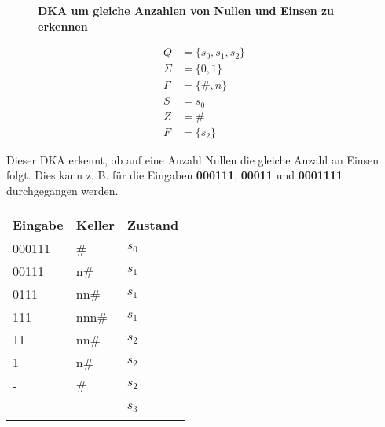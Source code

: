 \begin{figure}[h]
    \centering
    \caption*{\textbf{DKA um gleiche Anzahlen von Nullen und Einsen zu erkennen}}
\end{figure}

\Large
\begin{align*}
    Q & = \{s_0, s_1, s_2\} \\
    \Sigma & = \{0, 1\} \\
    \Gamma & = \{\#, n\} \\
    S & = s_0 \\
    Z & = \# \\
    F & = \{s_2\}
\end{align*}
\normalsize

Dieser DKA erkennt, ob auf eine Anzahl Nullen die gleiche Anzahl an Einsen folgt.
Dies kann z. B. für die Eingaben \textbf{000111}, \textbf{00011} und \textbf{0001111}
durchgegangen werden.

\clearpage

\begin{table}[h]
    \begin{tabular}{|l|l|l|}
    \hline
    Eingabe & Keller & Zustand \\ \hline
    000111 & \# & $s_0$ \\ \hline
    00111 & n\# & $s_1$ \\ \hline
    0111 & nn\# & $s_1$ \\ \hline
    111 & nnn\# & $s_1$ \\ \hline
    11 & nn\# & $s_2$ \\ \hline
    1 & n\# & $s_2$ \\ \hline
    - & \# & $s_2$ \\ \hline
    - & - & $s_3$ \\ \hline
    \end{tabular}
\end{table}

